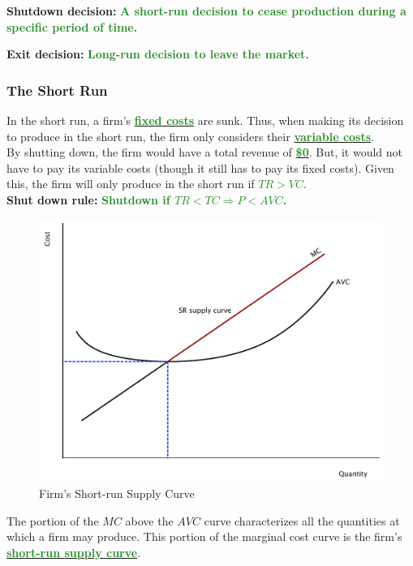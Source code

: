 \documentclass[11pt]{article}\usepackage[]{graphicx}\usepackage[]{color}
\theoremstyle{definition}
\newcommand{\ddp}[1]{{\textbf{\textcolor{ForestGreen}{#1}}}}
\newcommand{\dd}[1]{{\underline{\textbf{\textcolor{ForestGreen}{#1}}}}}
\newcommand{\defn}[1]{\textbf{#1}}
\begin{document}
	\defn{Shutdown decision:} \ddp{A short-run decision to cease production during a specific period of time.\\}
	
	
	\defn{Exit decision:} \ddp{Long-run decision to leave the market.}
	
	\subsubsection*{The Short Run}
	
	In the short run, a firm's \dd{fixed costs} are sunk. Thus, when making its decision to produce in the short run, the firm only considers their \dd{variable costs}. 
	\\
	
	By shutting down, the firm would have a total revenue of \dd{\$0}. But, it would not have to pay its variable costs (though it still has to pay its fixed costs). Given this, the firm will only produce in the short run if \dd{$TR>VC$}. 
	\\
	
	\defn{Shut down rule:} \ddp{Shutdown if $ TR < TC \Rightarrow P < AVC$.}
	
	
			\begin{figure}[H]
				\centering
				\includegraphics[scale=.40]{plot64.pdf}
				\caption{Firm's Short-run Supply Curve}
			\end{figure}
	
	The portion of the $MC$ above the $AVC$ curve characterizes all the quantities at which a firm may produce. This portion of the marginal cost curve is the firm's \dd{short-run supply curve}.
	\\
	
\end{document}
